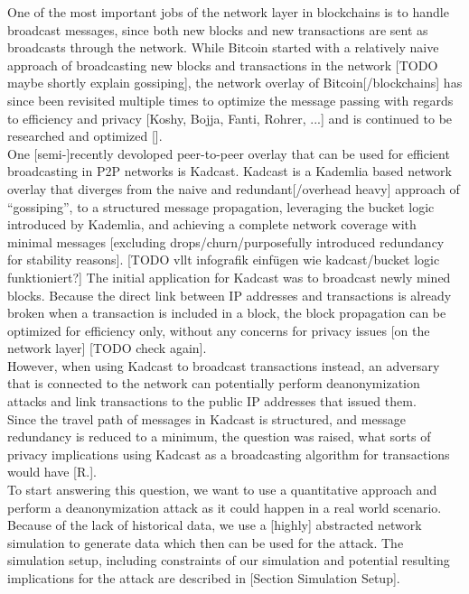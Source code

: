 One of the most important jobs of the network layer in blockchains is to handle broadcast messages, since
both new blocks and new transactions are sent as broadcasts through the network.
While Bitcoin started with a relatively naive approach of broadcasting new blocks and transactions in the network [TODO maybe shortly explain gossiping],
the network overlay of Bitcoin[/blockchains] has since been revisited multiple times to optimize the message passing with regards to efficiency and privacy [Koshy, Bojja, Fanti, Rohrer, ...] and is continued to be researched and optimized []. \\
One [semi-]recently devoloped peer-to-peer overlay that can be used for efficient broadcasting in P2P networks is Kadcast.
Kadcast is a Kademlia based network overlay that diverges from the naive and redundant[/overhead heavy] approach of ``gossiping'', to a structured message propagation, leveraging the bucket logic introduced by Kademlia, and achieving a complete network coverage with minimal messages
[excluding drops/churn/purposefully introduced redundancy for stability reasons]. [TODO vllt infografik einfügen wie kadcast/bucket logic funktioniert?]
The initial application for Kadcast was to broadcast newly mined blocks. Because the direct link between IP addresses and transactions is already broken when a transaction is included in a block, the block propagation can be optimized for efficiency only, without any concerns for privacy issues [on the network layer] [TODO check again]. \\
However, when using Kadcast to broadcast transactions instead, an adversary that is connected to the network can potentially perform
deanonymization attacks and link transactions to the public IP addresses that issued them. \\
Since the travel path of messages in Kadcast is structured, and message redundancy is reduced to a minimum, the question was raised, what sorts of privacy implications using Kadcast as a broadcasting algorithm for transactions would have [R.]. \\
To start answering this question, we want to use a quantitative approach and perform a deanonymization attack
as it could happen in a real world scenario. Because of the lack of historical data, we use a [highly] abstracted network
simulation to generate data which then can be used for the attack. The simulation setup, including constraints of our simulation and potential resulting implications for the attack are described in [Section Simulation Setup]. \\
